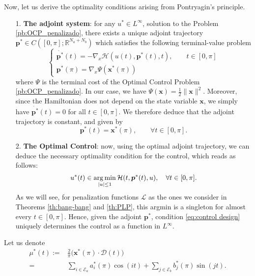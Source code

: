 \documentclass[twocolumn]{autart}    %
\begin{document}
Now, let us derive the optimality conditions arising from Pontryagin's principle.
\begin{itemize}
	\item[1.] \textbf{The adjoint system}: for any $u^\ast \in L^\infty$, solution to the Problem \ref{pb:OCP_penalizado}, there exists a unique adjoint trajectory $\bm{p}^\ast\in C([0,\pi]; \mathbb{R}^{N_a+N_b})$ which satisfies the following terminal-value problem
    \begin{equation*}
    	\begin{cases}
    		\dot{\bm{p}^\ast}(t) = -\nabla_x \mathcal{H}(u(t),\bm{p}^\ast(t),t), \qquad t \in [0,\pi] 
    		\\[5pt]
    		\bm{p}^\ast (\pi) = \nabla_x \Psi (\bm{x}^\ast (\pi))
    	\end{cases}
    \end{equation*}
    where $\Psi$ is the terminal cost of the Optimal Control Problem \ref{pb:OCP_penalizado}. In our case, we have $\Psi (\bm{x}) = \frac{1}{2} \| \bm{x}\|^2$. Moreover, since the Hamiltonian does not depend on the state variable $\bm{x}$, we simply have $\dot{\bm{p}^\ast}(t) = 0$ for all $t \in [0,\pi]$. We therefore deduce that the adjoint trajectory is constant, and given by
    \begin{equation}\label{eq:adjoint constant}
		\bm{p}^\ast (t) = \bm{x}^\ast (\pi), \qquad \forall t \in [0,\pi]. 
	\end{equation}
    
    \item[2.] \textbf{The Optimal  Control}: now, using the optimal adjoint trajectory, we can deduce the necessary optimality condition for the control, which reads as follows:
    \begin{align}\label{eq:control design}
    	u^* (t) \in \operatorname*{arg\,min}_{|u|\leq 1} \mathcal{H}(t,\bm{p}^*(t),u), \quad \forall t \in [0,\pi].
    \end{align}
    As we will see, for penalization functions $\mathcal{L}$ as the ones we consider in Theorems \ref{th:bang-bang} and \ref{th:PLP}, this argmin is a singleton for almost every $t\in [0,\pi]$. Hence, given the adjoint $\bm{p}^\ast$,  condition \eqref{eq:control design} uniquely determines the control as a function in $L^\infty$.
\end{itemize}
Let us denote 
\begin{align}\label{eq:m ast}
	\mu^\ast (t) := & \frac 2\pi \big(\bm{x}^*(\pi) \cdot \bm{\mathcal{D}}(t)\big) 
	\\[5pt]
	= & \sum_{i \in \mathcal{E}_a} a^*_i (\pi) \cos(it) + \sum_{j \in \mathcal{E}_b} b^*_j (\pi) \sin(jt). \nonumber
\end{align}
\end{document}
